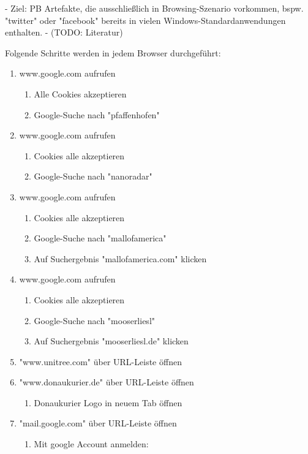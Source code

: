 - Ziel: PB Artefakte, die ausschließlich in Browsing-Szenario vorkommen, bspw. "twitter" oder "facebook" bereits in vielen Windows-Standardanwendungen enthalten.
- (TODO: Literatur)

Folgende Schritte werden in jedem Browser durchgeführt: 

\begin{enumerate}
\item  www.google.com aufrufen
	\begin{enumerate}[label*=\arabic*.]
	\item Alle Cookies akzeptieren 
	\item Google-Suche nach "pfaffenhofen"
	\end{enumerate}
\item www.google.com aufrufen
	\begin{enumerate}[label*=\arabic*.]
	\item Cookies alle akzeptieren 
	\item Google-Suche nach "nanoradar" 
	\end{enumerate}
\item www.google.com aufrufen
	\begin{enumerate}[label*=\arabic*.]
	\item Cookies alle akzeptieren 
	\item Google-Suche nach "mallofamerica"
	\item Auf Suchergebnis "mallofamerica.com" klicken
	\end{enumerate}
\item www.google.com aufrufen
	\begin{enumerate}[label*=\arabic*.]
	\item Cookies alle akzeptieren 
	\item Google-Suche nach "mooserliesl"
	\item Auf Suchergebnis "mooserliesl.de" klicken
	\end{enumerate}
\item "www.unitree.com" über URL-Leiste öffnen
\item "www.donaukurier.de" über URL-Leiste öffnen
	\begin{enumerate}[label*=\arabic*.]
	\item Donaukurier Logo in neuem Tab öffnen
	\end{enumerate}
\item "mail.google.com" über URL-Leiste öffnen
	\begin{enumerate}[label*=\arabic*.]
	\item Mit google Account anmelden: 

\end{enumerate}
\end{enumerate}
